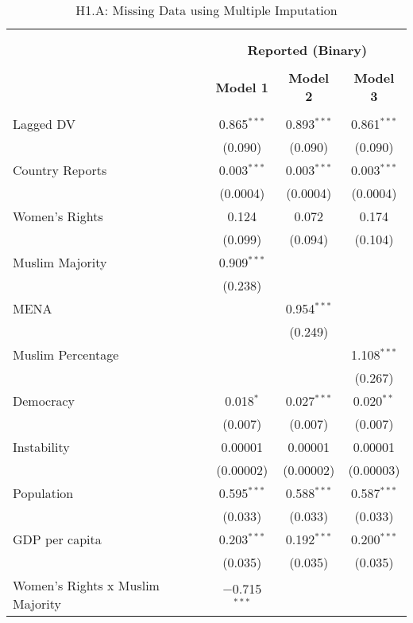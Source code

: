 
\begin{table}[!htbp] \centering 
  \caption{H1.A: Missing Data using Multiple Imputation} 
  \label{} 
\begin{tabular}{@{\extracolsep{5pt}}lccc} 
\\[-1.8ex]\hline \\[-1.8ex] 
\\[-1.8ex] & \multicolumn{3}{c}{\textbf{Reported (Binary)}} \\ 
\\[-1.8ex] & \textbf{Model 1} & \textbf{Model 2} & \textbf{Model 3}\\ 
\hline \\[-1.8ex] 
 Lagged DV & 0.865$^{***}$ & 0.893$^{***}$ & 0.861$^{***}$ \\ 
  & (0.090) & (0.090) & (0.090) \\ 
  Country Reports & 0.003$^{***}$ & 0.003$^{***}$ & 0.003$^{***}$ \\ 
  & (0.0004) & (0.0004) & (0.0004) \\ 
  Women's Rights & 0.124 & 0.072 & 0.174 \\ 
  & (0.099) & (0.094) & (0.104) \\ 
  Muslim Majority & 0.909$^{***}$ &  &  \\ 
  & (0.238) &  &  \\ 
  MENA &  & 0.954$^{***}$ &  \\ 
  &  & (0.249) &  \\ 
  Muslim Percentage &  &  & 1.108$^{***}$ \\ 
  &  &  & (0.267) \\ 
  Democracy & 0.018$^{*}$ & 0.027$^{***}$ & 0.020$^{**}$ \\ 
  & (0.007) & (0.007) & (0.007) \\ 
  Instability & 0.00001 & 0.00001 & 0.00001 \\ 
  & (0.00002) & (0.00002) & (0.00003) \\ 
  Population & 0.595$^{***}$ & 0.588$^{***}$ & 0.587$^{***}$ \\ 
  & (0.033) & (0.033) & (0.033) \\ 
  GDP per capita & 0.203$^{***}$ & 0.192$^{***}$ & 0.200$^{***}$ \\ 
  & (0.035) & (0.035) & (0.035) \\ 
  Women's Rights x Muslim Majority & $-$0.715$^{***}$ &  &  \\ 

\end{tabular}
\end{table}
